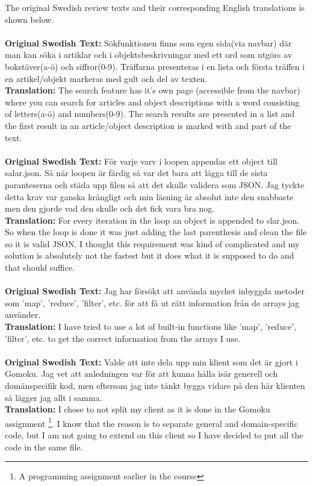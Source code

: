\documentclass[twoside,twocolumn,a4paper,11pt,english]{article}
\begin{document}
The original Swedish review texts and their corresponding English translations is shown below.
\\
\\
\textbf{Original Swedish Text:} Sökfunktionen finns som egen sida(via navbar) där man kan söka i artiklar och i objektsbeskrivningar med ett ord som utgörs av bokstäver(a-ö) och siffror(0-9). Träffarna presenteras i en lista och första träffen i en artikel/objekt markeras med gult och del av texten.
\\
\textbf{Translation:} The search feature has it's own page (accessible from the navbar) where you can search for articles and object descriptions with a word consisting of letters(a-ö) and numbers(0-9). The search results are presented in a list and the first result in an article/object description is marked with and part of the text.
\\
\\
\textbf{Original Swedish Text:} För varje varv i loopen appendas ett object till salar.json. Så när loopen är färdig så var det bara att lägga till de sista paranteserna och städa upp filen så att det skulle validera som JSON. Jag tyckte detta krav var ganska krångligt och min läsning är absolut inte den snabbaste men den gjorde vad den skulle och det fick vara bra nog.
\\
\textbf{Translation:} For every iteration in the loop an object is appended to slar.json. So when the loop is done it was just adding the last parenthesis and clean the file so it is valid JSON. I thought this requirement was kind of complicated and my solution is absolutely not the fastest but it does what it is supposed to do and that should suffice.
\\
\\
\textbf{Original Swedish Text:} Jag har försökt att använda mycket inbyggda metoder som 'map', 'reduce', 'filter', etc. för att få ut rätt information från de arrays jag använder.
\\
\textbf{Translation:} I have tried to use a lot of built-in functions like 'map', 'reduce', 'filter', etc. to get the correct information from the arrays I use.
\\
\\
\textbf{Original Swedish Text:} Valde att inte dela upp min klient som det är gjort i Gomoku. Jag vet att anledningen var för att kunna hålla isär generell och domänspecifik kod, men eftersom jag inte tänkt bygga vidare på den här klienten så lägger jag allt i samma.
\\
\textbf{Translation:} I chose to not split my client as it is done in the Gomoku assignment \footnote{A programming assignment earlier in the course}. I know that the reason is to separate general and domain-specific code, but I am not going to extend on this client so I have decided to put all the code in the same file.
\end{document}
